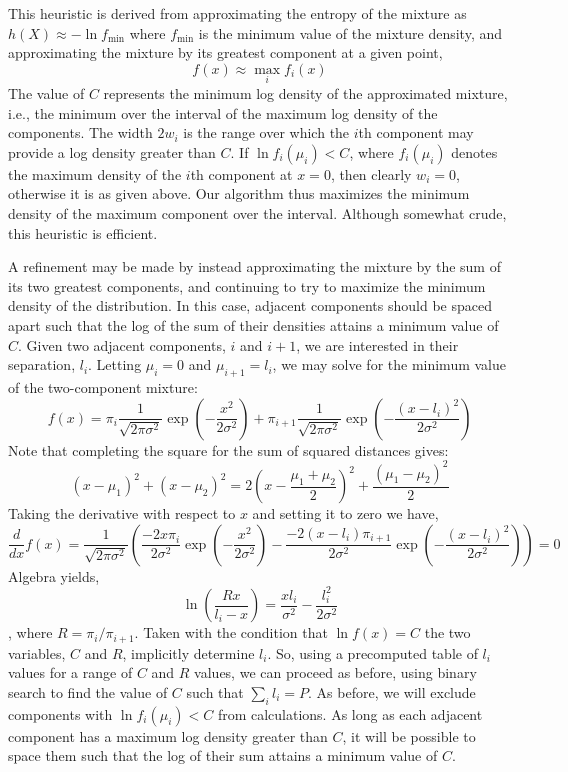 This heuristic is derived from approximating the entropy of the mixture as
$h(X) \approx - \ln f_{\min}$ where $f_{\min}$ is the minimum value of the mixture density,
and approximating the mixture by its greatest component at a given point,
$$f(x) \approx \max_i f_i(x)$$
The value of $C$ represents the minimum log density of the approximated mixture, i.e.,
the minimum over the interval of the maximum log density of the components.
The width $2w_i$ is the range over which the $i$th component may provide a log
density greater than $C$. If $\ln f_i(\mu_i) < C$, where $f_i(\mu_i)$ denotes the maximum density of the $i$th component at $x=0$, then clearly $w_i = 0$, otherwise it is as given above.
Our algorithm thus maximizes the minimum density of the maximum component over the interval.
Although somewhat crude, this heuristic is efficient.

A refinement may be made by instead approximating the mixture by the sum of its two greatest components,
and continuing to try to maximize the minimum density of the distribution.
In this case, adjacent components should be spaced apart such that the log of the sum of their densities
attains a minimum value of $C$.
Given two adjacent components, $i$ and $i+1$, we are interested in their separation, $l_i$.
Letting $\mu_i = 0$ and $\mu_{i+1} = l_i$, we may
solve for the minimum value of the two-component mixture:
$$f(x) = \pi_i \frac{1}{\sqrt{2 \pi \sigma^2}} \exp\left( - \frac{x^2}{2 \sigma^2} \right) + \pi_{i+1} \frac{1}{\sqrt{2 \pi \sigma^2}} \exp\left( - \frac{(x - l_i)^2}{2 \sigma^2} \right)$$
Note that completing the square for the sum of squared distances gives:
$$(x - \mu_1)^2 + (x - \mu_2)^2 = 2\left(x - \frac{\mu_1 + \mu_2}{2}\right)^2 + \frac{(\mu_1 - \mu_2)^2}{2}$$
Taking the derivative with respect to $x$ and setting it to zero we have,
$$\frac{d}{dx} f(x) = \frac{1}{\sqrt{2 \pi \sigma^2}} \left( \frac{-2x\pi_i}{2\sigma^2} \exp\left( - \frac{x^2}{2 \sigma^2} \right) - \frac{-2(x - l_i)\pi_{i+1}}{2\sigma^2} \exp\left( - \frac{(x - l_i)^2}{2 \sigma^2} \right) \right) = 0$$
Algebra yields,
$$\ln \left( \frac{R x}{l_i - x} \right) = \frac{x l_i}{\sigma^2} - \frac{l_i^2}{2 \sigma^2}$$,
where $R = \pi_i / \pi_{i+1}$.
Taken with the condition that $\ln f(x) = C$
the two variables, $C$ and $R$, implicitly determine $l_i$. So, using
a precomputed table of $l_i$ values for a range of $C$ and $R$ values, we can proceed as before,
using binary search to find the value of $C$ such that $\sum_i l_i = P$.
As before, we will exclude components with $\ln f_i(\mu_i) < C$ from calculations.
As long as each adjacent component has a maximum log density greater than $C$, it will be possible
to space them such that the log of their sum attains a minimum value of $C$.

